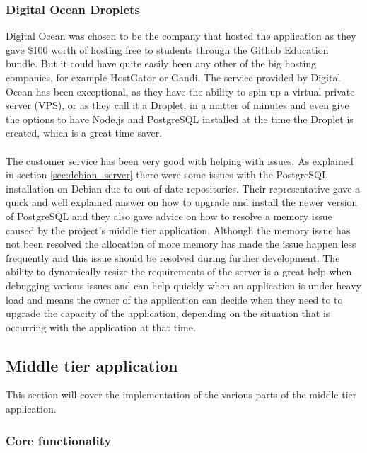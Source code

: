 \subsubsection{Digital Ocean Droplets}
\label{sec:digial_oceans}

Digital Ocean was chosen to be the company that hosted the application as they gave \$100 worth of hosting free to students through the Github Education bundle. But it could have quite easily been any other of the big hosting companies, for example HostGator or Gandi. The service provided by Digital Ocean has been exceptional, as they have the ability to spin up a virtual private server (VPS), or as they call it a Droplet, in a matter of minutes and even give the options to have Node.js and PostgreSQL installed at the time the Droplet is created, which is a great time saver.\\
\\
The customer service has been very good with helping with issues. As explained in section \ref{sec:debian_server} there were some issues with the PostgreSQL installation on Debian due to out of date repositories. Their representative gave a quick and well explained answer on how to upgrade and install the newer version of PostgreSQL and they also gave advice on how to resolve a memory issue caused by the project's middle tier application. Although the memory issue has not been resolved the allocation of more memory has made the issue happen less frequently and this issue should be resolved during further development. The ability to dynamically resize the requirements of the server is a great help when debugging various issues and can help quickly when an application is under heavy load and means the owner of the application can decide when they need to to upgrade the capacity of the application, depending on the situation that is occurring with the application at that time.

\subsection{Middle tier application}

This section will cover the implementation of the various parts of the middle tier application.

\subsubsection{Core functionality}

